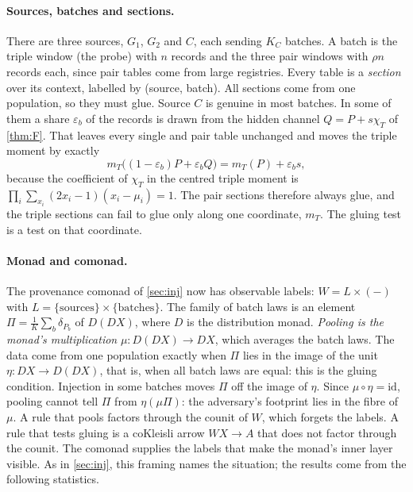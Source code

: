\documentclass[11pt]{article}
\theoremstyle{definition}\newtheorem{definition}{Definition}\newtheorem{remark}{Remark}
\begin{document}
\paragraph{Sources, batches and sections.} There are three sources, $G_1$, $G_2$ and $C$, each sending $K_C$ batches. A batch is the
triple window (the probe) with $n$ records and the three pair windows with $\rho n$ records each, since pair tables come from large
registries. Every table is a \emph{section} over its context, labelled by (source, batch). All sections come from one population, so
they must glue. Source $C$ is genuine in most batches. In some of them a share $\varepsilon_b$ of the records is drawn from the hidden
channel $Q=P+s\chi_T$ of \cref{thm:F}. That leaves every single and pair table unchanged and moves the triple moment by exactly
\[
m_T\bigl((1-\varepsilon_b)P+\varepsilon_bQ\bigr)=m_T(P)+\varepsilon_b s,
\]
because the coefficient of $\chi_T$ in the centred triple moment is $\prod_i\sum_{x_i}(2x_i-1)(x_i-\mu_i)=1$. The pair sections therefore
always glue, and the triple sections can fail to glue only along one coordinate, $m_T$. The gluing test is a test on that coordinate.

\paragraph{Monad and comonad.} The provenance comonad of \cref{sec:inj} now has observable labels: $W=L\times(-)$ with
$L=\{\text{sources}\}\times\{\text{batches}\}$. The family of batch laws is an element $\Pi=\frac1K\sum_b\delta_{P_b}$ of $D(DX)$,
where $D$ is the distribution monad. \emph{Pooling is the monad's multiplication} $\mu:D(DX)\to DX$, which averages the batch laws. The
data come from one population exactly when $\Pi$ lies in the image of the unit $\eta:DX\to D(DX)$, that is, when all batch laws are
equal: this is the gluing condition. Injection in some batches moves $\Pi$ off the image of $\eta$. Since $\mu\circ\eta=\mathrm{id}$,
pooling cannot tell $\Pi$ from $\eta(\mu\Pi)$: the adversary's footprint lies in the fibre of $\mu$. A rule that pools factors through
the counit of $W$, which forgets the labels. A rule that tests gluing is a coKleisli arrow $WX\to A$ that does not factor through the
counit. The comonad supplies the labels that make the monad's inner layer visible. As in \cref{sec:inj}, this framing names the
situation; the results come from the following statistics.
\end{document}
